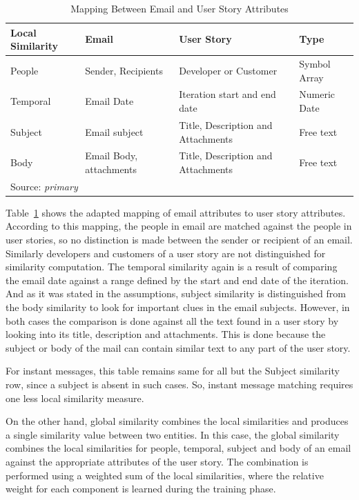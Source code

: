 \begin{table}[at]
  \centering
  \caption{Mapping Between Email and User Story Attributes}
    \begin{tabular}{|p{2.5cm}|p{4cm}|p{5cm}|p{2cm}|}
      \hline
      \textbf{Local Similarity} & \textbf{Email} & \textbf{User Story} & \textbf{Type} \\
      \hline
      People & Sender, Recipients & Developer or Customer & Symbol Array\\      
      \hline
      Temporal & Email Date & Iteration start and end date & Numeric Date \\
      \hline
      Subject & Email subject & Title, Description and Attachments & Free text\\
      \hline
      Body & Email Body, attachments & Title, Description and Attachments & Free text\\
      \hline
      \multicolumn{4}{l}{Source: \emph{primary}}
    \end{tabular}
	\label{tab:mapping}
\end{table}

Table~\ref{tab:mapping} shows the adapted mapping of email attributes to user story attributes. According to this mapping, the people in email are matched against the people in user stories, so no distinction is made between the sender or recipient of an email. Similarly developers and customers of a user story are not distinguished for similarity computation. The temporal similarity again is a result of comparing the email date against a range defined by the start and end date of the iteration. And as it was stated in the assumptions, subject similarity is distinguished from the body similarity to look for important clues in the email subjects. However, in both cases the comparison is done against all the text found in a user story by looking into its title, description and attachments. This is done because the subject or body of the mail can contain similar text to any part of the user story.

For instant messages, this table remains same for all but the Subject similarity row, since a subject is absent in such cases. So, instant message matching requires one less local similarity measure.

On the other hand, global similarity combines the local similarities and produces a single similarity value between two entities. In this case, the global similarity combines the local similarities for people, temporal, subject and body of an email against the appropriate attributes of the user story. The combination is performed using a weighted sum of the local similarities, where the relative weight for each component is learned during the training phase.


